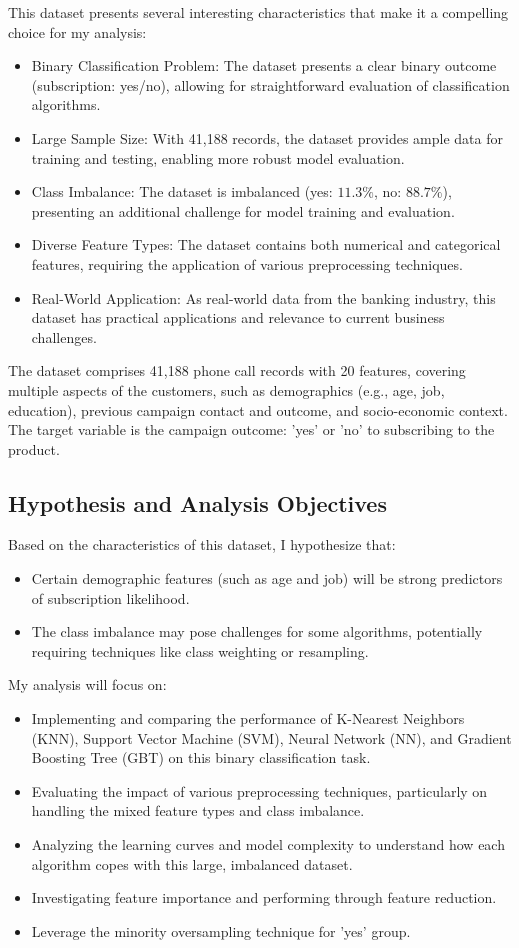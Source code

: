 \documentclass[conference]{IEEEtran}
\begin{document}
This dataset presents several interesting characteristics that make it a compelling choice for my analysis:
\begin{itemize}
    \item Binary Classification Problem: The dataset presents a clear binary outcome (subscription: yes/no), allowing for straightforward evaluation of classification algorithms.
    \item Large Sample Size: With 41,188 records, the dataset provides ample data for training and testing, enabling more robust model evaluation.
    \item Class Imbalance: The dataset is imbalanced (yes: $11.3\%$, no: $88.7\%$), presenting an additional challenge for model training and evaluation.
    \item Diverse Feature Types: The dataset contains both numerical and categorical features, requiring the application of various preprocessing techniques.
    \item Real-World Application: As real-world data from the banking industry, this dataset has practical applications and relevance to current business challenges.
\end{itemize}

The dataset comprises 41,188 phone call records with 20 features, covering multiple aspects of the customers, such as demographics (e.g., age, job, education), previous campaign contact and outcome, and socio-economic context. The target variable is the campaign outcome: 'yes' or 'no' to subscribing to the product.

\subsection{Hypothesis and Analysis Objectives}
Based on the characteristics of this dataset, I hypothesize that:
\begin{itemize}
    \item Certain demographic features (such as age and job) will be strong predictors of subscription likelihood.
    \item The class imbalance may pose challenges for some algorithms, potentially requiring techniques like class weighting or resampling.
\end{itemize}
My analysis will focus on:
\begin{itemize}
    \item Implementing and comparing the performance of K-Nearest Neighbors (KNN), Support Vector Machine (SVM), Neural Network (NN), and Gradient Boosting Tree (GBT) on this binary classification task.
    \item Evaluating the impact of various preprocessing techniques, particularly on handling the mixed feature types and class imbalance.
    \item Analyzing the learning curves and model complexity to understand how each algorithm copes with this large, imbalanced dataset.
    \item Investigating feature importance and performing through feature reduction.
    \item Leverage the minority oversampling technique for 'yes' group. 
\end{itemize}
\end{document}

